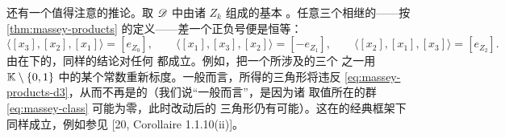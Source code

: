 \begin{remark}\label{thm:massey-product-exactness}
还有一个值得注意的推论。取 $\mathscr{D}$ 中由诸\trObject{} $Z_k$ 组成的基本%
\trExactTriangle。任意三个相继\trMorphism{}的\trMasseyProduct{}——按
\cref{thm:massey-products} 的定义——差一个正负号便是恒等：
\begin{equation}\label{eq:massey-products-d3}
\langle[x_3],[x_2],[x_1]\rangle=[e_{Z_0}],\qquad
\langle[x_1],[x_3],[x_2]\rangle=[-e_{Z_1}],\qquad
\langle[x_2],[x_1],[x_3]\rangle=[e_{Z_2}].
\end{equation}
由\trMasseyProduct{}在\trAFunctor{}下的\trFunctoriality，同样的结论对任何%
\trExactTriangle{}都成立。例如，把一个\trExactTriangle{}所涉及的三个\trMorphism{}%
之一用 $\mathbb{K}\setminus\{0,1\}$ 中的某个常数重新标度。一般而言，所得的三角形将违反
\eqref{eq:massey-products-d3}，从而不再是\trExact{}的（我们说“一般而言”，是因为诸%
\trMasseyProduct{}取值所在的\trQuotient{}群\eqref{eq:massey-class} 可能为零，此时改动后的
三角形仍有可能\trExact）。这在\trTriangulated\trCategory{}的经典框架下同样成立，例如参见
[20, Corollaire 1.1.10(ii)]。
\end{remark}

